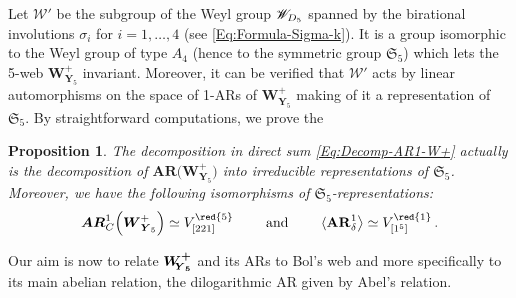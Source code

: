 \documentclass[11pt]{amsart}
\newtheorem{prop}[thm]{Proposition}
\begin{document}
Let $\mathscr W'$ be the subgroup of the Weyl group $\boldsymbol{\mathscr W}_{\hspace{-0.1cm}D_5}$ 
spanned by the birational involutions $\sigma_i$ for $i=1,\ldots,4$ (see \eqref{Eq:Formula-Sigma-k}). It is a group isomorphic to the Weyl group of type $A_4$ (hence to the symmetric group $\mathfrak S_5$) which lets the 5-web $\boldsymbol{W}_{\boldsymbol{Y}_5}^{+}$ invariant.  
Moreover, it can be verified that 
$\mathscr W'$ acts by linear automorphisms on the space of 1-ARs of $\boldsymbol{W}_{\boldsymbol{Y}_5}^{+}$ making of it a representation of $\mathfrak S_5$. 
 By straightforward computations, we prove the 
 \begin{prop}
 The decomposition in direct sum \eqref{Eq:Decomp-AR1-W+} actually is the decomposition of $\boldsymbol{AR}\big( \boldsymbol{W}_{\boldsymbol{Y}_5}^{+}
 \big)$ into irreducible representations of $\mathfrak S_5$. 
 Moreover, we have the following isomorphisms of 
$\mathfrak S_5$-representations:
 \begin{equation}
 \label{Eq:1-ARs-W+}
 \boldsymbol{AR}^1_{C}\Big( \boldsymbol{W}_{\boldsymbol{Y}_5}^{+}\Big)
 \simeq V_{[221]}^{{\red{5}}}
 \qquad \mbox{ and } \qquad 
 \langle 
{\bf AR}_\delta^1
\big\rangle\simeq  V_{[1^5]}^{{\red{1}}}\, . 
 \end{equation}
 \end{prop}
Our aim is now to relate $\boldsymbol{W^{+}_{\hspace{-0.1cm} \boldsymbol{Y}_5}}$ and its ARs to Bol's web and more specifically  to its main abelian relation, the dilogarithmic AR given by Abel's relation. 

\end{document}
